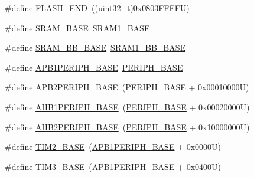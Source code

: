 \begin{DoxyCompactItemize}
\item 
\#define \hyperlink{group___peripheral__registers__structures_ga8be554f354e5aa65370f6db63d4f3ee4}{F\+L\+A\+S\+H\+\_\+\+E\+ND}~((uint32\+\_\+t)0x0803\+F\+F\+F\+F\+U)
\item 
\#define \hyperlink{group___peripheral__registers__structures_ga05e8f3d2e5868754a7cd88614955aecc}{S\+R\+A\+M\+\_\+\+B\+A\+SE}~\hyperlink{group___peripheral__memory__map_ga7d0fbfb8894012dbbb96754b95e562cd}{S\+R\+A\+M1\+\_\+\+B\+A\+SE}
\item 
\#define \hyperlink{group___peripheral__registers__structures_gad3548b6e2f017f39d399358f3ac98454}{S\+R\+A\+M\+\_\+\+B\+B\+\_\+\+B\+A\+SE}~\hyperlink{group___peripheral__memory__map_gac4c4f61082e4b168f29d9cf97dc3ca5c}{S\+R\+A\+M1\+\_\+\+B\+B\+\_\+\+B\+A\+SE}
\item 
\#define \hyperlink{group___peripheral__registers__structures_ga45666d911f39addd4c8c0a0ac3388cfb}{A\+P\+B1\+P\+E\+R\+I\+P\+H\+\_\+\+B\+A\+SE}~\hyperlink{group___peripheral__memory__map_ga9171f49478fa86d932f89e78e73b88b0}{P\+E\+R\+I\+P\+H\+\_\+\+B\+A\+SE}
\item 
\#define \hyperlink{group___peripheral__registers__structures_ga25b99d6065f1c8f751e78f43ade652cb}{A\+P\+B2\+P\+E\+R\+I\+P\+H\+\_\+\+B\+A\+SE}~(\hyperlink{group___peripheral__memory__map_ga9171f49478fa86d932f89e78e73b88b0}{P\+E\+R\+I\+P\+H\+\_\+\+B\+A\+SE} + 0x00010000\+U)
\item 
\#define \hyperlink{group___peripheral__registers__structures_ga811a9a4ca17f0a50354a9169541d56c4}{A\+H\+B1\+P\+E\+R\+I\+P\+H\+\_\+\+B\+A\+SE}~(\hyperlink{group___peripheral__memory__map_ga9171f49478fa86d932f89e78e73b88b0}{P\+E\+R\+I\+P\+H\+\_\+\+B\+A\+SE} + 0x00020000\+U)
\item 
\#define \hyperlink{group___peripheral__registers__structures_gaeedaa71d22a1948492365e2cd26cfd46}{A\+H\+B2\+P\+E\+R\+I\+P\+H\+\_\+\+B\+A\+SE}~(\hyperlink{group___peripheral__memory__map_ga9171f49478fa86d932f89e78e73b88b0}{P\+E\+R\+I\+P\+H\+\_\+\+B\+A\+SE} + 0x10000000\+U)
\item 
\#define \hyperlink{group___peripheral__registers__structures_ga00d0fe6ad532ab32f0f81cafca8d3aa5}{T\+I\+M2\+\_\+\+B\+A\+SE}~(\hyperlink{group___peripheral__memory__map_ga45666d911f39addd4c8c0a0ac3388cfb}{A\+P\+B1\+P\+E\+R\+I\+P\+H\+\_\+\+B\+A\+SE} + 0x0000\+U)
\item 
\#define \hyperlink{group___peripheral__registers__structures_gaf0c34a518f87e1e505cd2332e989564a}{T\+I\+M3\+\_\+\+B\+A\+SE}~(\hyperlink{group___peripheral__memory__map_ga45666d911f39addd4c8c0a0ac3388cfb}{A\+P\+B1\+P\+E\+R\+I\+P\+H\+\_\+\+B\+A\+SE} + 0x0400\+U)

\end{DoxyCompactItemize}
